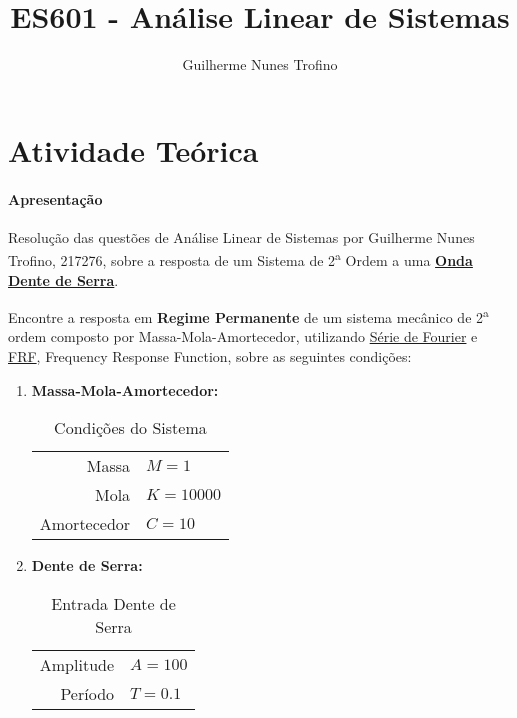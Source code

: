 \documentclass{article}
\title{ES601 - Análise Linear de Sistemas}
\author{Guilherme Nunes Trofino}
\begin{document}
    \maketitle
\newpage

\section{Atividade Teórica}
    \paragraph{Apresentação}Resolução das questões de Análise Linear de Sistemas por Guilherme Nunes Trofino, 217276, sobre a resposta de um Sistema de 2\textsuperscript{a} Ordem a uma \href{https://en.wikipedia.org/wiki/Sawtooth_wave}{\textbf{Onda Dente de Serra}}.
    \begin{exercise}
        Encontre a resposta em \textbf{Regime Permanente} de um sistema mecânico de 2\textsuperscript{a} ordem composto por Massa-Mola-Amortecedor, utilizando \href{https://en.wikipedia.org/wiki/Fourier_series}{Série de Fourier} e \href{https://en.wikipedia.org/wiki/Frequency_response}{FRF}, Frequency Response Function, sobre as seguintes condições:
        \begin{enumerate}
            \item \textbf{Massa-Mola-Amortecedor:}\begin{table}[H]
                \centering\begin{tabular}{rl}\hline
                    Massa        & $M=1$\\
                    Mola         & $K=10000$\\
                    Amortecedor  & $C=10$\\\hline
                \end{tabular}
                \caption{Condições do Sistema}
                \label{tb:MMA}
            \end{table}
            \item \textbf{Dente de Serra:}\begin{table}[H]
                \centering\begin{tabular}{rl}\hline
                    Amplitude & $A=100$\\
                    Período   & $T=0.1$\\\hline
                \end{tabular}
                \caption{Entrada Dente de Serra}
                \label{tb:DS}
            \end{table}
        \end{enumerate}
    \end{exercise}
\end{document}
